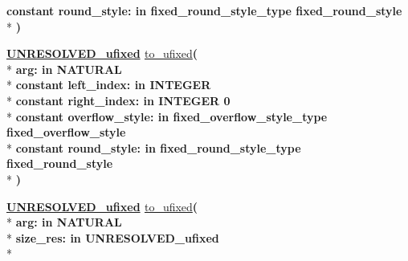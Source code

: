 \begin{DoxyCompactItemize}
{\bfseries {\bfseries \textcolor{keywordflow}{constant}\textcolor{vhdlchar}{ }}\textcolor{vhdlchar}{round\+\_\+style\+: }\textcolor{stringliteral}{in }\textcolor{vhdlchar}{fixed\+\_\+round\+\_\+style\+\_\+type     fixed\+\_\+round\+\_\+style}}\\*
{\bfseries  )} 
\item 
{\bfseries {\bfseries {\bfseries \hyperlink{classfixed__pkg_ae78bc2b36d22f6abeac163955e8a587d}{U\+N\+R\+E\+S\+O\+L\+V\+E\+D\+\_\+ufixed}} \textcolor{vhdlchar}{ }}} \hyperlink{classfixed__pkg_a1c021bc528d8e3b63c69f6bf47c8053e}{to\+\_\+ufixed}{\bfseries  ( }\\*
{\bfseries \textcolor{vhdlchar}{arg\+: }\textcolor{stringliteral}{in }{\bfseries \textcolor{comment}{N\+A\+T\+U\+R\+A\+L}\textcolor{vhdlchar}{ }}}\\*
{\bfseries {\bfseries \textcolor{keywordflow}{constant}\textcolor{vhdlchar}{ }}\textcolor{vhdlchar}{left\+\_\+index\+: }\textcolor{stringliteral}{in }{\bfseries \textcolor{comment}{I\+N\+T\+E\+G\+E\+R}\textcolor{vhdlchar}{ }}}\\*
{\bfseries {\bfseries \textcolor{keywordflow}{constant}\textcolor{vhdlchar}{ }}\textcolor{vhdlchar}{right\+\_\+index\+: }\textcolor{stringliteral}{in }\textcolor{vhdlchar}{I\+N\+T\+E\+G\+E\+R   0}}\\*
{\bfseries {\bfseries \textcolor{keywordflow}{constant}\textcolor{vhdlchar}{ }}\textcolor{vhdlchar}{overflow\+\_\+style\+: }\textcolor{stringliteral}{in }\textcolor{vhdlchar}{fixed\+\_\+overflow\+\_\+style\+\_\+type     fixed\+\_\+overflow\+\_\+style}}\\*
{\bfseries {\bfseries \textcolor{keywordflow}{constant}\textcolor{vhdlchar}{ }}\textcolor{vhdlchar}{round\+\_\+style\+: }\textcolor{stringliteral}{in }\textcolor{vhdlchar}{fixed\+\_\+round\+\_\+style\+\_\+type     fixed\+\_\+round\+\_\+style}}\\*
{\bfseries  )} 
\item 
{\bfseries {\bfseries {\bfseries \hyperlink{classfixed__pkg_ae78bc2b36d22f6abeac163955e8a587d}{U\+N\+R\+E\+S\+O\+L\+V\+E\+D\+\_\+ufixed}} \textcolor{vhdlchar}{ }}} \hyperlink{classfixed__pkg_ade2913ec678d66be09db3a25d30ded44}{to\+\_\+ufixed}{\bfseries  ( }\\*
{\bfseries \textcolor{vhdlchar}{arg\+: }\textcolor{stringliteral}{in }{\bfseries \textcolor{comment}{N\+A\+T\+U\+R\+A\+L}\textcolor{vhdlchar}{ }}}\\*
{\bfseries \textcolor{vhdlchar}{size\+\_\+res\+: }\textcolor{stringliteral}{in }\textcolor{vhdlchar}{U\+N\+R\+E\+S\+O\+L\+V\+E\+D\+\_\+ufixed}}\\*

\end{DoxyCompactItemize}
